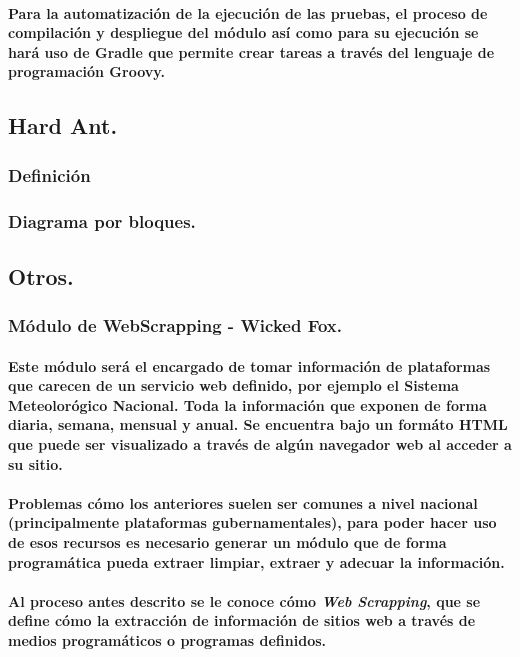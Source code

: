 	  \paragraph{Para la automatización de la ejecución de las pruebas, el proceso de compilación y despliegue del módulo así como para su ejecución se hará uso de Gradle que permite crear tareas a través del lenguaje de programación Groovy.}
  \subsection{Hard Ant.}
  	\subsubsection{Definición}
  	\subsubsection{Diagrama por bloques.}
  \subsection{Otros.}
    \subsubsection{Módulo de WebScrapping - Wicked Fox.}
    \paragraph{Este módulo será el encargado de tomar información de plataformas que carecen de un servicio web definido, por ejemplo el Sistema Meteolorógico Nacional. Toda la información que exponen de forma diaria, semana, mensual y anual. Se encuentra bajo un formáto HTML que puede ser visualizado a través de algún navegador web al acceder a su sitio.}
    \paragraph{Problemas cómo los anteriores suelen ser comunes a nivel nacional (principalmente plataformas gubernamentales), para poder hacer uso de esos recursos es necesario generar un módulo que de forma programática pueda extraer limpiar, extraer y adecuar la información.}
    \paragraph{Al proceso antes descrito se le conoce cómo \emph{Web Scrapping}\cite{6}, que se define cómo la extracción de información de sitios web a través de medios programáticos o programas definidos.}
